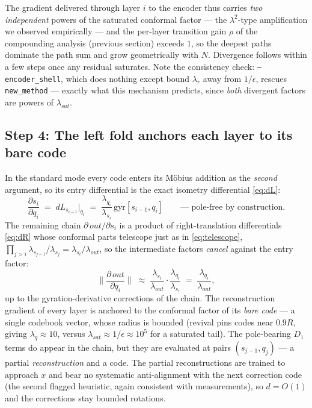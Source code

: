 \documentclass{article}
\begin{document}
The gradient delivered through layer $i$ to the encoder thus carries \emph{two independent} powers of the saturated conformal factor --- the $\lambda^2$-type amplification we observed empirically --- and the per-layer transition gain $\rho$ of the compounding analysis (previous section) exceeds $1$, so the deepest paths dominate the path sum and grow geometrically with $N$. Divergence follows within a few steps once any residual saturates. Note the consistency check: \texttt{--encoder\_shell}, which does nothing except bound $\lambda_{r}$ away from $1/\epsilon$, rescues \texttt{new\_method} --- exactly what this mechanism predicts, since \emph{both} divergent factors are powers of $\lambda_{sat}$.

\subsection*{Step 4: The left fold anchors each layer to its bare code}
In the standard mode every code enters its M\"obius addition as the \emph{second} argument, so its entry differential is the exact isometry differential \eqref{eq:dL}:
\begin{equation}
    \frac{\partial s_i}{\partial q_i} \;=\; dL_{s_{i-1}}\big|_{q_i} \;=\; \frac{\lambda_{q_i}}{\lambda_{s_i}}\, \text{gyr}[s_{i-1}, q_i]
    \qquad \text{--- pole-free by construction.}
\end{equation}
The remaining chain $\partial\, out/\partial s_i$ is a product of right-translation differentials \eqref{eq:dR} whose conformal parts telescope just as in \eqref{eq:telescope}, $\prod_{j > i} \lambda_{s_{j-1}}/\lambda_{s_j} = \lambda_{s_i}/\lambda_{out}$, so the intermediate factors \emph{cancel} against the entry factor:
\begin{equation}
    \Big\| \frac{\partial\, out}{\partial q_i} \Big\| \;\approx\; \frac{\lambda_{s_i}}{\lambda_{out}} \cdot \frac{\lambda_{q_i}}{\lambda_{s_i}} \;=\; \frac{\lambda_{q_i}}{\lambda_{out}} ,
\end{equation}
up to the gyration-derivative corrections of the chain. The reconstruction gradient of every layer is anchored to the conformal factor of its \emph{bare code} --- a single codebook vector, whose radius is bounded (revival pins codes near $0.9 R$, giving $\lambda_q \approx 10$, versus $\lambda_{sat} \approx 1/\epsilon \approx 10^5$ for a saturated tail). The pole-bearing $D_1$ terms do appear in the chain, but they are evaluated at pairs $(s_{j-1}, q_j)$ --- a partial \emph{reconstruction} and a code. The partial reconstructions are trained to approach $x$ and bear no systematic anti-alignment with the next correction code (the second flagged heuristic, again consistent with measurements), so $d = O(1)$ and the corrections stay bounded rotations.
\end{document}
